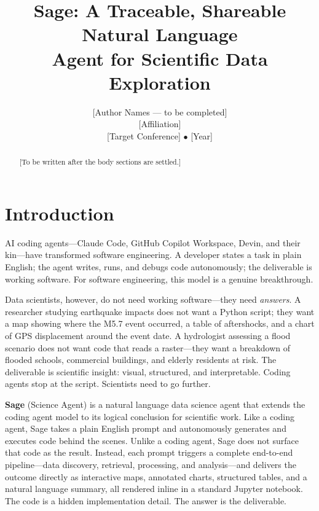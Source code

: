 \documentclass[10pt,twocolumn]{article}
\begin{document}
\title{\textbf{Sage: A Traceable, Shareable Natural Language\\
Agent for Scientific Data Exploration}}

\author{
[Author Names --- to be completed]\\
\small [Affiliation]\\
\small [Target Conference] $\bullet$ [Year]
}

\date{}
\maketitle

\begin{abstract}
[To be written after the body sections are settled.]
\end{abstract}

\section{Introduction}

AI coding agents---Claude Code, GitHub Copilot Workspace, Devin, and their kin---have
transformed software engineering. A developer states a task in plain English; the agent
writes, runs, and debugs code autonomously; the deliverable is working software. For
software engineering, this model is a genuine breakthrough.

Data scientists, however, do not need working software---they need \emph{answers}.
A researcher studying earthquake impacts does not want a Python script; they want a map
showing where the M5.7 event occurred, a table of aftershocks, and a chart of GPS
displacement around the event date. A hydrologist assessing a flood scenario does not
want code that reads a raster---they want a breakdown of flooded schools, commercial
buildings, and elderly residents at risk. The deliverable is scientific insight: visual,
structured, and interpretable. Coding agents stop at the script. Scientists need to go
further.

\textbf{Sage} (Science Agent) is a natural language data science agent that extends the
coding agent model to its logical conclusion for scientific work. Like a coding agent,
Sage takes a plain English prompt and autonomously generates and executes code behind the
scenes. Unlike a coding agent, Sage does not surface that code as the result. Instead,
each prompt triggers a complete end-to-end pipeline---data discovery, retrieval,
processing, and analysis---and delivers the outcome directly as interactive maps,
annotated charts, structured tables, and a natural language summary, all rendered inline
in a standard Jupyter notebook. The code is a hidden implementation detail. The answer is
the deliverable.
\end{document}
